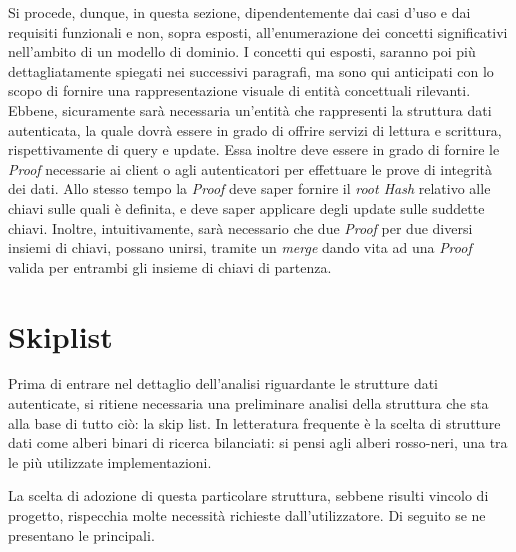 	
 	Si procede, dunque, in questa sezione, dipendentemente dai casi d'uso e dai requisiti funzionali e non, sopra esposti, all'enumerazione dei concetti significativi nell'ambito di un modello di dominio. I concetti qui esposti, saranno poi più dettagliatamente spiegati nei successivi paragrafi, ma sono qui anticipati con lo scopo di fornire una rappresentazione visuale di entità concettuali rilevanti.
 	Ebbene, sicuramente sarà necessaria un'entità che rappresenti la struttura dati autenticata, la quale dovrà essere in grado di offrire servizi di lettura e scrittura, rispettivamente di query e update. Essa inoltre deve essere in grado di fornire le \textit{Proof} necessarie ai client o agli autenticatori per effettuare le prove di integrità dei dati. Allo stesso tempo la \textit{Proof} deve saper fornire il \textit{root Hash} relativo alle chiavi sulle quali è definita, e deve saper applicare degli update sulle suddette chiavi. Inoltre, intuitivamente, sarà necessario che due \textit{Proof} per due diversi insiemi di chiavi, possano unirsi, tramite un \textit{merge} dando vita ad una \textit{Proof} valida per entrambi gli insieme di chiavi di partenza.

	
\section{Skiplist}

%

	Prima di entrare nel dettaglio dell'analisi riguardante le strutture dati autenticate, si ritiene necessaria una preliminare analisi della struttura che sta alla base di tutto ciò: la skip list. In letteratura frequente è la scelta di strutture dati come alberi binari di ricerca bilanciati: si pensi agli alberi rosso-neri, una tra le più utilizzate implementazioni.
	
	La scelta di adozione di questa particolare struttura, sebbene risulti vincolo di progetto, rispecchia molte necessità richieste dall'utilizzatore. Di seguito se ne presentano le principali.
	
